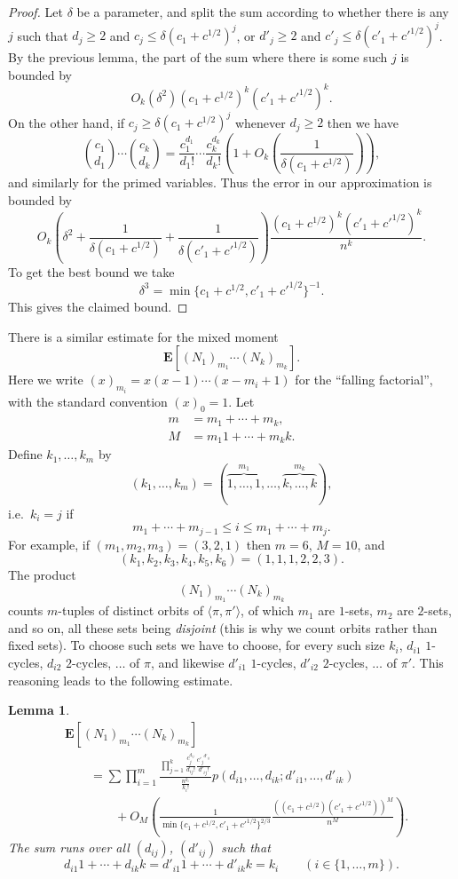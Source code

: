 \documentclass[10pt,a4paper]{amsart}
\newcommand{\ie}{i.e.\ }
\newtheorem{lemma}[theorem]{Lemma}
\theoremstyle{remark}
\newcommand\E{\mathbf{E}}
\newcommand\br[1]{\left({#1}\right)}
\newcommand\pfrac[2]{\br{\frac{#1}{#2}}}
\begin{document}
\begin{proof}
Let $\delta$ be a parameter, and split the sum according to whether there is any $j$ such that $d_j \geq 2$ and $c_j \leq \delta (c_1 + c^{1/2})^j$, or $d'_j\geq 2$ and $c'_j \leq \delta (c'_1 + {c'}^{1/2})^j$. By the previous lemma, the part of the sum where there is some such $j$ is bounded by
\[
 O_k(\delta^2) (c_1 + c^{1/2})^k (c'_1 + {c'}^{1/2})^k.
\]
On the other hand, if $c_j \geq \delta (c_1 + c^{1/2})^j$ whenever $d_j \geq 2$ then we have
\[
 \binom{c_1}{d_1} \cdots \binom{c_k}{d_k}
 = \frac{c_1^{d_1}}{d_1!} \cdots \frac{c_k^{d_k}}{d_k!} \left(1 + O_k\pfrac{1}{\delta (c_1 + c^{1/2})} \right),
\]
and similarly for the primed variables. Thus the error in our approximation is bounded by
\[
 O_k\left(\delta^2 + \frac1{\delta (c_1 + c^{1/2})} + \frac1{\delta (c'_1 + {c'}^{1/2})} \right)
 \frac{(c_1 + c^{1/2})^k (c'_1 + {c'}^{1/2})^k}{n^k}.
\]
To get the best bound we take
\[
 \delta^3 = \min\{c_1 + c^{1/2}, c'_1 + {c'}^{1/2}\}^{-1}.
\]
This gives the claimed bound.
\end{proof}

There is a similar estimate for the mixed moment
\[
 \E[(N_1)_{m_1} \cdots (N_k)_{m_k}].
\]
Here we write $(x)_{m_i} = x(x-1) \cdots (x-m_i+1)$ for the ``falling factorial'', with the standard convention $(x)_0=1$. Let
\begin{align*}
 m &= m_1 + \cdots + m_k, \\
 M &= m_1 1 + \cdots + m_k k.
\end{align*}
Define $k_1, \dots, k_m$ by
\[
 (k_1, \dots, k_m) = (
 \overbrace{1, \dots, 1}^{m_1},
 \dots,
 \overbrace{k, \dots, k}^{m_k}
 ),
\]
\ie $k_i = j$ if
\[
 m_1 + \cdots + m_{j-1} \leq i \leq m_1 + \cdots + m_j.
\]
For example, if $(m_1, m_2, m_3) = (3, 2, 1)$ then $m = 6$, $M = 10$, and
\[
 (k_1, k_2, k_3, k_4, k_5, k_6)
 = (1, 1, 1, 2, 2, 3).
\]
The product
\[
 (N_1)_{m_1} \cdots (N_k)_{m_k}
\]
counts $m$-tuples of distinct orbits of $\langle \pi, \pi'\rangle$, of which $m_1$ are $1$-sets, $m_2$ are $2$-sets, and so on, all these sets being \emph{disjoint} (this is why we count orbits rather than fixed sets). To choose such sets we have to choose, for every such size $k_i$, $d_{i1}$ $1$-cycles, $d_{i2}$ $2$-cycles, $\dots$ of $\pi$, and likewise $d'_{i1}$ $1$-cycles, $d'_{i2}$ $2$-cycles, $\dots$ of $\pi'$. This reasoning leads to the following estimate.

\begin{lemma}
\begin{align*}
 &\E[(N_1)_{m_1} \cdots (N_k)_{m_k}] \\
 &\qquad = \sum \prod_{i=1}^m \frac{\prod_{j=1}^{k} \frac{c_j^{d_{ij}}}{d_{ij}!}\frac{{c'_j}^{d'_{ij}}}{d'_{ij}!}}{\frac{n^{k_i}}{k_i!}} p(d_{i1}, \dots, d_{ik} ; d'_{i1}, \dots, d'_{ik}) \\
 &\qquad\qquad + O_M\left(
 \frac1{\min\{c_1 + c^{1/2}, c'_1 + {c'}^{1/2}\}^{2/3}}
 \frac{((c_1 + c^{1/2})(c'_1 + {c'}^{1/2}))^M}{n^M}
 \right).
\end{align*}
The sum runs over all $(d_{ij})$, $(d'_{ij})$ such that
\[
 d_{i1} 1 + \cdots + d_{ik} k =
 d'_{i1} 1 + \cdots + d'_{ik} k = k_i \qquad (i \in \{1, \dots, m\}).
\]
\end{lemma}
\end{document}
